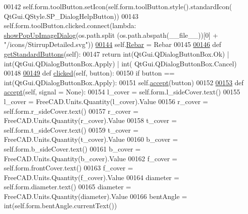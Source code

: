 \begin{DoxyCode}
00142         self.form.toolButton.setIcon(self.form.toolButton.style().standardIcon(
      QtGui.QStyle.SP\_DialogHelpButton))
00143         self.form.toolButton.clicked.connect(\textcolor{keyword}{lambda}: \hyperlink{namespacePopUpImage_a8c565620d7de9b4882a44eacb870ad05}{showPopUpImageDialog}(os.path.split
      (os.path.abspath(\_\_file\_\_))[0] + \textcolor{stringliteral}{"/icons/StirrupDetailed.svg"}))
\hypertarget{Stirrup_8py_source.tex_l00144}{}\hyperlink{classStirrup_1_1__StirrupTaskPanel_a004a341f992f38ca54893edf92f85faa}{00144}         self.\hyperlink{classStirrup_1_1__StirrupTaskPanel_a004a341f992f38ca54893edf92f85faa}{Rebar} = Rebar
00145 
\hypertarget{Stirrup_8py_source.tex_l00146}{}\hyperlink{classStirrup_1_1__StirrupTaskPanel_a517a35306c1eedd497869edb78b53b8b}{00146}     \textcolor{keyword}{def }\hyperlink{classStirrup_1_1__StirrupTaskPanel_a517a35306c1eedd497869edb78b53b8b}{getStandardButtons}(self):
00147         \textcolor{keywordflow}{return} int(QtGui.QDialogButtonBox.Ok) | int(QtGui.QDialogButtonBox.Apply) | int(
      QtGui.QDialogButtonBox.Cancel)
00148 
\hypertarget{Stirrup_8py_source.tex_l00149}{}\hyperlink{classStirrup_1_1__StirrupTaskPanel_aa1caeff48053cc3a43ed215e5c5c01c8}{00149}     \textcolor{keyword}{def }\hyperlink{classStirrup_1_1__StirrupTaskPanel_aa1caeff48053cc3a43ed215e5c5c01c8}{clicked}(self, button):
00150         \textcolor{keywordflow}{if} button == int(QtGui.QDialogButtonBox.Apply):
00151             self.\hyperlink{classStirrup_1_1__StirrupTaskPanel_a49957596860a74388ec2e64535eacbc6}{accept}(button)
00152 
\hypertarget{Stirrup_8py_source.tex_l00153}{}\hyperlink{classStirrup_1_1__StirrupTaskPanel_a49957596860a74388ec2e64535eacbc6}{00153}     \textcolor{keyword}{def }\hyperlink{classStirrup_1_1__StirrupTaskPanel_a49957596860a74388ec2e64535eacbc6}{accept}(self, signal = None):
00154         l\_cover = self.form.l\_sideCover.text()
00155         l\_cover = FreeCAD.Units.Quantity(l\_cover).Value
00156         r\_cover = self.form.r\_sideCover.text()
00157         r\_cover = FreeCAD.Units.Quantity(r\_cover).Value
00158         t\_cover = self.form.t\_sideCover.text()
00159         t\_cover = FreeCAD.Units.Quantity(t\_cover).Value
00160         b\_cover = self.form.b\_sideCover.text()
00161         b\_cover = FreeCAD.Units.Quantity(b\_cover).Value
00162         f\_cover = self.form.frontCover.text()
00163         f\_cover = FreeCAD.Units.Quantity(f\_cover).Value
00164         diameter = self.form.diameter.text()
00165         diameter = FreeCAD.Units.Quantity(diameter).Value
00166         bentAngle = int(self.form.bentAngle.currentText())

\end{DoxyCode}
